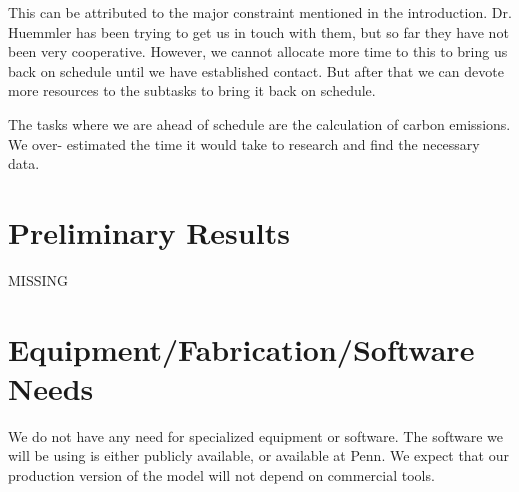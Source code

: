 \documentclass[draft,12pt,titlepage]{article}
\begin{document}
This can be attributed to the major constraint mentioned in the introduction. Dr. Huemmler
has been trying to get us in touch with them, but so far they have not been very cooperative.
However, we cannot allocate more time to this to bring us back on schedule until we have
established contact. But after that we can devote more resources to the subtasks to bring it
back on schedule.

The tasks where we are ahead of schedule are the calculation of carbon emissions. We over-
estimated the time it would take to research and find the necessary data.

\section{Preliminary Results}
{\huge MISSING}

\addtocounter{section}{1} %

\section{Equipment/Fabrication/Software Needs}
We do not have any need for specialized equipment or software. The software we will be using is either publicly available, or available at Penn. We expect that our production version of the model will not depend on commercial tools.

\addtocounter{section}{1} %
\end{document}
